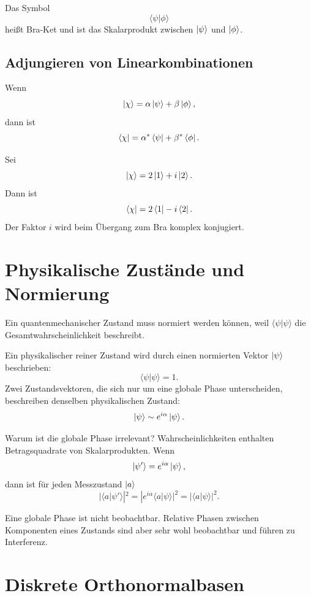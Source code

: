 Das Symbol
\[
    \langle\psi|\phi\rangle
\]
heißt Bra-Ket und ist das Skalarprodukt zwischen $\left|\psi\right\rangle$ und $\left|\phi\right\rangle$.

\subsection{Adjungieren von Linearkombinationen}

Wenn
\[
    \left|\chi\right\rangle=\alpha\left|\psi\right\rangle+\beta\left|\phi\right\rangle,
\]
dann ist
\[
    \left\langle\chi\right|=\alpha^*\left\langle\psi\right|+\beta^*\left\langle\phi\right|.
\]

\begin{examplebox}
Sei
\[
    \left|\chi\right\rangle=2\left|1\right\rangle+i\left|2\right\rangle.
\]
Dann ist
\[
    \left\langle\chi\right|=2\left\langle1\right|-i\left\langle2\right|.
\]
Der Faktor $i$ wird beim Übergang zum Bra komplex konjugiert.
\end{examplebox}

\section{Physikalische Zustände und Normierung}

Ein quantenmechanischer Zustand muss normiert werden können, weil $\langle\psi|\psi\rangle$ die Gesamtwahrscheinlichkeit beschreibt.

\begin{definitionbox}
Ein physikalischer reiner Zustand wird durch einen normierten Vektor $\left|\psi\right\rangle$ beschrieben:
\[
    \langle\psi|\psi\rangle=1.
\]
Zwei Zustandsvektoren, die sich nur um eine globale Phase unterscheiden, beschreiben denselben physikalischen Zustand:
\[
    \left|\psi\right\rangle\sim e^{i\alpha}\left|\psi\right\rangle.
\]
\end{definitionbox}

Warum ist die globale Phase irrelevant? Wahrscheinlichkeiten enthalten Betragsquadrate von Skalarprodukten. Wenn
\[
    \left|\psi'\right\rangle=e^{i\alpha}\left|\psi\right\rangle,
\]
dann ist für jeden Messzustand $\left|a\right\rangle$
\[
    |\langle a|\psi'\rangle|^2
    =|e^{i\alpha}\langle a|\psi\rangle|^2
    =|\langle a|\psi\rangle|^2.
\]

\begin{notebox}
Eine globale Phase ist nicht beobachtbar. Relative Phasen zwischen Komponenten eines Zustands sind aber sehr wohl beobachtbar und führen zu Interferenz.
\end{notebox}

\section{Diskrete Orthonormalbasen}

